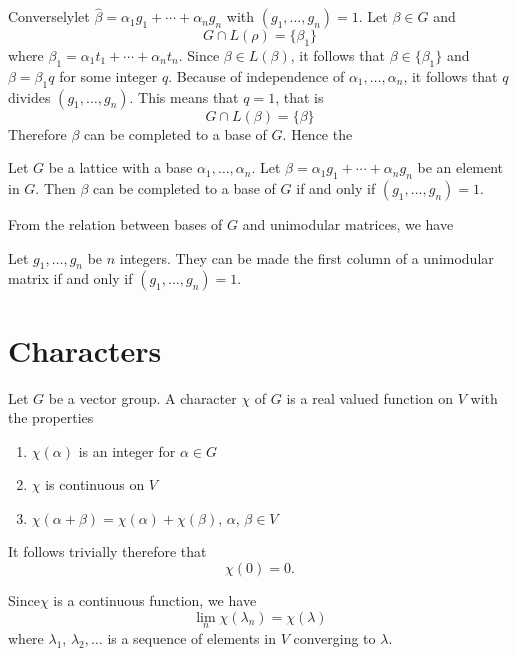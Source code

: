 Conversely\pageoriginale let
$\hat{\beta}=\alpha_{1} g_{1}+\cdots+\alpha_{n}g_{n}$ 
with $(g_{1},\ldots,g_{n})=1$. Let $\beta\in G$ and
$$
G\cap L(\rho)=\{\beta_{1}\}
$$
where $\beta_{1}=\alpha_{1}t_{1}+\cdots+\alpha_{n}t_{n}$. Since
$\beta\in L(\beta)$, it follows that $\beta\in\{\beta_{1}\}$ and
$\beta=\beta_{1}q$ for some integer $q$. Because of independence of
$\alpha_{1},\ldots,\alpha_{n}$, it follows that $q$ divides
$(g_{1},\ldots,g_{n})$. This means that $q=1$, that is
$$
G\cap L(\beta)=\{\beta\}
$$
Therefore $\beta$ can be completed to a base of $G$. Hence the

\begin{thm}\label{chap1:thm3}
Let $G$ be a lattice with a base $\alpha_{1},\ldots,\alpha_{n}$. Let
$\beta=\alpha_{1}g_{1}+\cdots+\alpha_{n}g_{n}$ be an element in
$G$. Then $\beta$ can be completed to a base of $G$ if and only if
$(g_{1},\ldots,g_{n})=1$. 
\end{thm}

From the relation between bases of $G$ and unimodular matrices, we
have

\begin{coro*}
Let $g_{1},\ldots,g_{n}$ be $n$ integers. They can be made the first
column of a unimodular matrix if and only if $(g_{1},\ldots,g_{n})=1$.
\end{coro*}

\section{Characters}\label{chap1:sec3}

Let $G$ be a vector group. A character $\chi$ of $G$ is a real valued
function on $V$ with the properties
\begin{enumerate}
\renewcommand{\labelenumi}{\theenumi)}
\item $\chi(\alpha)$ is an integer for $\alpha\in G$

\item $\chi$ is continuous on $V$

\item $\chi(\alpha+\beta)=\chi(\alpha)+\chi(\beta)$, $\alpha$,
  $\beta\in V$
\end{enumerate}
It follows trivially therefore that
$$
\chi(0)=0.
$$

Since\pageoriginale $\chi$ is a continuous function, we have
$$
\lim\limits_{n}\chi(\lambda_{n})=\chi(\lambda)
$$
where $\lambda_{1}$, $\lambda_{2},\ldots$ is a sequence of elements in
$V$ converging to $\lambda$.

